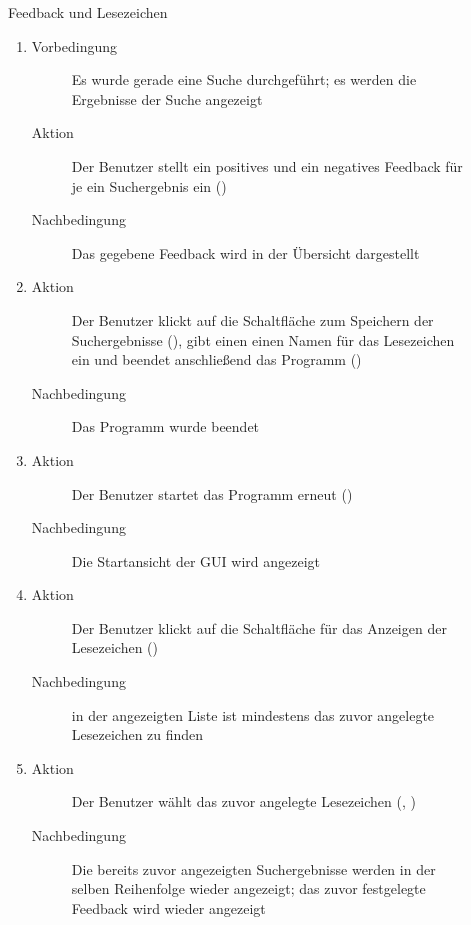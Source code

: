 \begin{description}
	\item[] Feedback und Lesezeichen
	\begin{enumerate}
		\item
		\begin{description}
			\item[Vorbedingung] Es wurde gerade eine Suche durchgeführt; es werden die Ergebnisse der Suche angezeigt
			\item[Aktion] Der Benutzer stellt ein positives und ein negatives Feedback für je ein Suchergebnis ein ()
			\item[Nachbedingung] Das gegebene Feedback wird in der Übersicht dargestellt
		\end{description}
		\item
		\begin{description}
			\item[Aktion] Der Benutzer klickt auf die Schaltfläche zum Speichern der Suchergebnisse (), gibt einen einen Namen für das Lesezeichen ein und beendet anschließend das Programm ()
			\item[Nachbedingung] Das Programm wurde beendet
		\end{description}
		\item
		\begin{description}
			\item[Aktion] Der Benutzer startet das Programm erneut ()
			\item[Nachbedingung] Die Startansicht der GUI wird angezeigt
		\end{description}
		\item
		\begin{description}
			\item[Aktion] Der Benutzer klickt auf die Schaltfläche für das Anzeigen der Lesezeichen ()
			\item[Nachbedingung] in der angezeigten Liste ist mindestens das zuvor angelegte Lesezeichen zu finden
		\end{description}
		\item
		\begin{description}
			\item[Aktion] Der Benutzer wählt das zuvor angelegte Lesezeichen (, )
			\item[Nachbedingung] Die bereits zuvor angezeigten Suchergebnisse werden in der selben Reihenfolge wieder angezeigt; das zuvor festgelegte Feedback wird wieder angezeigt
		\end{description}
	\end{enumerate}


\end{description}
